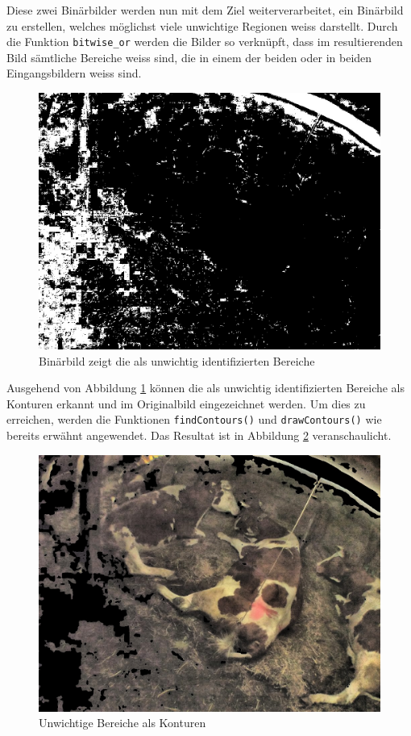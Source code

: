 Diese zwei Binärbilder werden nun mit dem Ziel weiterverarbeitet, ein Binärbild zu erstellen, welches möglichst viele unwichtige Regionen weiss darstellt. Durch die Funktion \texttt{bitwise_or} werden die Bilder so verknüpft, dass im resultierenden Bild sämtliche Bereiche weiss sind, die in einem der beiden oder in beiden Eingangsbildern weiss sind.
\begin{figure}[H]
	\center
	\includegraphics[scale=0.25]{Grafiken/entwicklung/5binLampeUndHolz.jpg}
	\caption{Binärbild zeigt die als unwichtig identifizierten Bereiche} 
	\label{fig: Binärbild zeigt sämtliche als unwichtig identifizierten Bereiche}
\end{figure}

Ausgehend von Abbildung \ref{fig: Binärbild zeigt sämtliche als unwichtig identifizierten Bereiche} können die als unwichtig identifizierten Bereiche als Konturen erkannt und im Originalbild eingezeichnet werden. Um dies zu erreichen, werden die Funktionen \texttt{findContours()} und \texttt{drawContours()} wie bereits erwähnt angewendet. Das Resultat ist in Abbildung \ref{fig: Unwichtige Bereiche als Konturen} veranschaulicht. 
\begin{figure}[H]
	\center
	\includegraphics[scale=0.43]{Grafiken/entwicklung/6unwichtigeBereicheEingezeichnet.jpg}
	\caption{Unwichtige Bereiche  als Konturen} 
	\label{fig: Unwichtige Bereiche als Konturen}
\end{figure}

